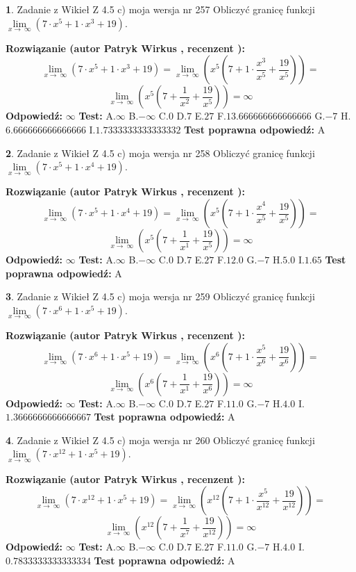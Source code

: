 \documentclass[12pt, a4paper]{article}
\theoremstyle{definition} %
\newtheorem{zad}{}
\newcommand{\zadStart}[1]{\begin{zad}#1\newline}
\newcommand{\zadStop}{\end{zad}}
\newcommand{\rozwStart}[2]{\noindent \textbf{Rozwiązanie (autor #1 , recenzent #2): }\newline}
\newcommand{\rozwStop}{\newline}
\newcommand{\odpStart}{\noindent \textbf{Odpowiedź:}\newline}
\newcommand{\odpStop}{\newline}
\newcommand{\testStart}{\noindent \textbf{Test:}\newline}
\newcommand{\testStop}{\newline}
\newcommand{\kluczStart}{\noindent \textbf{Test poprawna odpowiedź:}\newline}
\newcommand{\kluczStop}{\newline}
\begin{document}
\zadStart{Zadanie z Wikieł Z 4.5 c) moja wersja nr 257}
Obliczyć granicę funkcji  $\lim\limits_{x\to\ \infty}(7 \cdot x^{5}+1 \cdot x^{3}+19)$.
\zadStop
\rozwStart{Patryk Wirkus}{}
$$\lim\limits_{x\to\ \infty}(7 \cdot x^{5}+1 \cdot x^{3}+19) = \lim\limits_{x\to\ \infty}(x^{5}(7 +1 \cdot \frac{x^{3}}{x^{5}}+\frac{19}{x^{5}})) =$$ $$\lim\limits_{x\to\ \infty}(x^{5}(7 +\frac{1}{x^{2}}+\frac{19}{x^{5}})) =\infty$$
\rozwStop
\odpStart
$\infty$
\odpStop
\testStart
A.$\infty$ B.$-\infty$ C.$0$ D.$7$ E.$27$
F.$13.666666666666666$ G.$-7$
H.$6.666666666666666$
I.$1.7333333333333332$
\testStop
\kluczStart
A
\kluczStop



\zadStart{Zadanie z Wikieł Z 4.5 c) moja wersja nr 258}
Obliczyć granicę funkcji  $\lim\limits_{x\to\ \infty}(7 \cdot x^{5}+1 \cdot x^{4}+19)$.
\zadStop
\rozwStart{Patryk Wirkus}{}
$$\lim\limits_{x\to\ \infty}(7 \cdot x^{5}+1 \cdot x^{4}+19) = \lim\limits_{x\to\ \infty}(x^{5}(7 +1 \cdot \frac{x^{4}}{x^{5}}+\frac{19}{x^{5}})) =$$ $$\lim\limits_{x\to\ \infty}(x^{5}(7 +\frac{1}{x^{1}}+\frac{19}{x^{5}})) =\infty$$
\rozwStop
\odpStart
$\infty$
\odpStop
\testStart
A.$\infty$ B.$-\infty$ C.$0$ D.$7$ E.$27$
F.$12.0$ G.$-7$
H.$5.0$
I.$1.65$
\testStop
\kluczStart
A
\kluczStop



\zadStart{Zadanie z Wikieł Z 4.5 c) moja wersja nr 259}
Obliczyć granicę funkcji  $\lim\limits_{x\to\ \infty}(7 \cdot x^{6}+1 \cdot x^{5}+19)$.
\zadStop
\rozwStart{Patryk Wirkus}{}
$$\lim\limits_{x\to\ \infty}(7 \cdot x^{6}+1 \cdot x^{5}+19) = \lim\limits_{x\to\ \infty}(x^{6}(7 +1 \cdot \frac{x^{5}}{x^{6}}+\frac{19}{x^{6}})) =$$ $$\lim\limits_{x\to\ \infty}(x^{6}(7 +\frac{1}{x^{1}}+\frac{19}{x^{6}})) =\infty$$
\rozwStop
\odpStart
$\infty$
\odpStop
\testStart
A.$\infty$ B.$-\infty$ C.$0$ D.$7$ E.$27$
F.$11.0$ G.$-7$
H.$4.0$
I.$1.3666666666666667$
\testStop
\kluczStart
A
\kluczStop



\zadStart{Zadanie z Wikieł Z 4.5 c) moja wersja nr 260}
Obliczyć granicę funkcji  $\lim\limits_{x\to\ \infty}(7 \cdot x^{12}+1 \cdot x^{5}+19)$.
\zadStop
\rozwStart{Patryk Wirkus}{}
$$\lim\limits_{x\to\ \infty}(7 \cdot x^{12}+1 \cdot x^{5}+19) = \lim\limits_{x\to\ \infty}(x^{12}(7 +1 \cdot \frac{x^{5}}{x^{12}}+\frac{19}{x^{12}})) =$$ $$\lim\limits_{x\to\ \infty}(x^{12}(7 +\frac{1}{x^{7}}+\frac{19}{x^{12}})) =\infty$$
\rozwStop
\odpStart
$\infty$
\odpStop
\testStart
A.$\infty$ B.$-\infty$ C.$0$ D.$7$ E.$27$
F.$11.0$ G.$-7$
H.$4.0$
I.$0.7833333333333334$
\testStop
\kluczStart
A
\kluczStop
\end{document}

